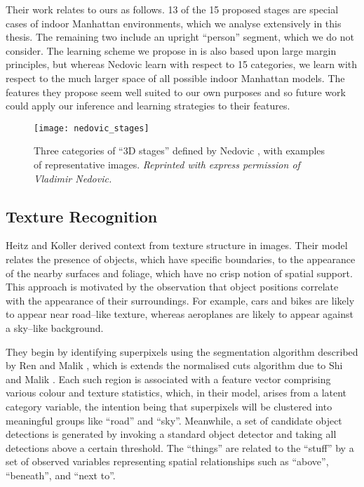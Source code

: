 Their work relates to ours as follows. 13 of the 15 proposed stages
are special cases of indoor Manhattan environments, which we analyse
extensively in this thesis. The remaining two include an upright
``person'' segment, which we do not consider. The learning scheme we
propose in  is also based upon large margin
principles, but whereas Nedovic \etal learn with respect to 15
categories, we learn with respect to the much larger space of all
possible indoor Manhattan models. The features they propose seem well
suited to our own purposes and so future work could apply our
inference and learning strategies to their features.\changedsinceviva

\begin{figure}[tb]
  \centering
  \texttt{[image: nedovic\_stages]}
  \caption{Three categories of ``3D stages'' defined by Nedovic \etal
    \cite{Nedovic2010}, with examples of representative images.
    \textit{Reprinted with express permission of Vladimir Nedovic.}}
  \label{fig:nedovic-stages}
\end{figure}

\subsection{Texture Recognition}

Heitz and Koller \cite{Heitz08} derived context from texture structure
in images. Their model relates the presence of objects, which have
specific boundaries, to the appearance of the nearby surfaces and
foliage, which have no crisp notion of spatial support. This approach
is motivated by the observation that object positions correlate with
the appearance of their surroundings. For example, cars and bikes are
likely to appear near road--like texture, whereas aeroplanes are
likely to appear against a sky--like background.

They begin by identifying superpixels using the segmentation algorithm
described by Ren and Malik \cite{Ren03}, which is extends the
normalised cuts algorithm due to Shi and Malik \cite{Shi2000}\changedsinceviva. Each
such region is associated with a feature vector comprising various
colour and texture statistics, which, in their model, arises from a
latent category variable, the intention being that superpixels will be
clustered into meaningful groups like ``road'' and ``sky''. Meanwhile,
a set of candidate object detections is generated by invoking a
standard object detector and taking all detections above a certain
threshold. The ``things'' are related to the ``stuff'' by a set of
observed variables representing spatial relationships such as
``above'', ``beneath'', and ``next to''.


